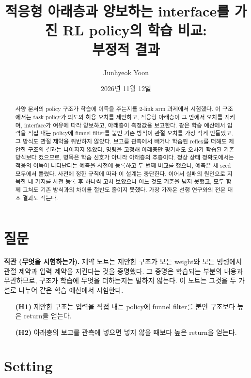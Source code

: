 \documentclass[11pt]{article}\usepackage[margin=1in]{geometry}\usepackage{amsmath,amssymb,amsthm,mathtools}\usepackage{graphicx}\graphicspath{{figures/}{../figures/}{figs/}{./}}\usepackage{enumitem}\usepackage{hyperref}\usepackage{cleveref}\usepackage{tikz}\usetikzlibrary{arrows.meta,positioning,calc,shapes.geometric}\usepackage{float}\usepackage[most]{tcolorbox}\usepackage{kotex}\usepackage{booktabs}\emergencystretch=1.6em\tolerance=2000 \crefname{assumption}{Assumption}{Assumptions}\Crefname{assumption}{Assumption}{Assumptions}\crefname{definition}{Definition}{Definitions}\Crefname{definition}{Definition}{Definitions}\crefname{proposition}{Proposition}{Propositions}\Crefname{proposition}{Proposition}{Propositions}\crefname{fact}{Fact}{Facts}\Crefname{fact}{Fact}{Facts} \newtheorem{assumption}{Assumption}\newtheorem{definition}{Definition}\newtheorem{lemma}{Lemma}\newtheorem{proposition}{Proposition}\newtheorem{theorem}{Theorem}\newtheorem{corollary}{Corollary}\newtheorem{fact}{Fact}\theoremstyle{remark}\newtheorem{remark}{Remark} \newcommand{\R}{\mathbb{R}}\newcommand{\U}{\mathcal U}
\title{적응형 아래층과 양보하는 interface를 가진 RL policy의 학습 비교:\\ 부정적 결과}
\author{Junhyeok Yoon}
\date{2026년 11월 12일}
\begin{document}
\maketitle

\begin{abstract}
사양 문서의 policy 구조가 학습에 이득을 주는지를 2-link arm 과제에서 시험했다. 이 구조에서는 task policy가 의도와 허용 오차를 제안하고, 적응형 아래층이 그 안에서 오차를 지키며, interface가 여유에 따라 양보하고, 아래층이 측정값을 보고한다. 같은 학습 예산에서 입력을 직접 내는 policy에 funnel filter를 붙인 기존 방식이 관절 오차를 가장 작게 만들었고, 그 방식도 관절 제약을 위반하지 않았다. 보고를 관측에서 빼거나 학습된 reflex를 더해도 제안한 구조의 결과는 나아지지 않았다. 명령을 고정해 아래층만 평가해도 오차가 학습된 기존 방식보다 컸으므로, 병목은 학습 신호가 아니라 아래층의 추종이다. 정상 상태 정확도에서는 적응의 이득이 나타난다는 예측을 사전에 등록하고 두 번째 비교를 했으나, 예측은 세 seed 모두에서 틀렸다. 사전에 정한 규칙에 따라 이 설계는 중단한다. 이어서 실패의 원인으로 지목한 네 가지를 사전 등록 후 하나씩 고쳐 보았으나 어느 것도 기준을 넘지 못했고, 모두 함께 고쳐도 기존 방식과의 차이를 절반도 줄이지 못했다. 가장 가까운 선행 연구와의 전문 대조 결과도 적는다.
\end{abstract}

\section{질문}
\label{sec:question}

\textbf{직관 (무엇을 시험하는가).} 제약 노트는 제안한 구조가 모든 weight와 모든 명령에서 관절 제약과 입력 제약을 지킨다는 것을 증명했다. 그 증명은 학습되는 부분의 내용과 무관하므로, 구조가 학습에 무엇을 더하는지는 말하지 않는다. 이 노트는 그것을 두 가설로 나누어 같은 학습 예산에서 시험한다.
\begin{itemize}
\item[\textbf{(H1)}] 제안한 구조는 입력을 직접 내는 policy에 funnel filter를 붙인 구조보다 높은 return을 얻는다.
\item[\textbf{(H2)}] 아래층의 보고를 관측에 넣으면 넣지 않을 때보다 높은 return을 얻는다.
\end{itemize}

\section{Setting}
\label{sec:setting}
\end{document}
